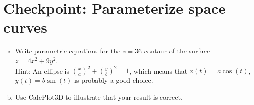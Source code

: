 


%


\allowdisplaybreaks
\section{Checkpoint: Parameterize space curves}

\begin{enumerate}[(a)]
    \item Write parametric equations for the $z=36$ contour of the surface $z=4x^2+9y^2$.\\
    Hint: An ellipse is $\displaystyle\left(\frac{x}{a}\right)^2 + \left(\frac{y}{b}\right)^2 = 1$, which means that $x(t) = a \cos(t)$, $y(t) = b\sin(t)$ is probably a good choice.
    \item Use CalcPlot3D to illustrate that your result is correct.
\end{enumerate}




	
